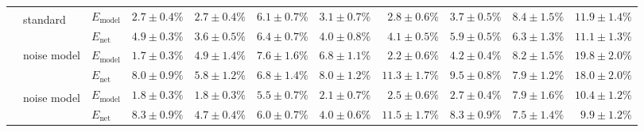\begin{sidewaystable}
\begin{tabular}{p{2.2cm} p{1.7cm} l r r r r r r r r }
	\\\cmidrule(l){2-11}
	&
	\multirow{2}{1.7cm}{\raggedleft %
	standard\textsuperscript{\dag}} &
	$E_\mathrm{model}$ & 
	\color{Gray}$2.7 \pm 0.4\%$ & \color{Gray}$2.7 \pm 0.4\%$ & \color{Gray}$6.1 \pm 0.7\%$ & \color{Gray}$3.1 \pm 0.7\%$ & \color{Gray}$2.8 \pm 0.6\%$ & \color{Gray}$3.7 \pm 0.5\%$ & \color{Gray}$8.4 \pm 1.5\%$ & \color{Gray}$11.9 \pm 1.4\%$
	\\
	& & 
	$E_\mathrm{net}$ &
	\cellcolor{White!100!SteelBlue}$\mathbf{4.9 \pm 0.3\%}$ & \cellcolor{White!100!SteelBlue}$\mathbf{3.6 \pm 0.5\%}$ & \cellcolor{White!94!SteelBlue}$6.4 \pm 0.7\%$ & \cellcolor{White!100!SteelBlue}$\mathbf{4.0 \pm 0.8\%}$ & \cellcolor{White!100!SteelBlue}$\mathbf{4.1 \pm 0.5\%}$ & \cellcolor{White!100!SteelBlue}$\mathbf{5.9 \pm 0.5\%}$ & \cellcolor{White!100!SteelBlue}$\mathbf{6.3 \pm 1.3\%}$ & \cellcolor{White!82!SteelBlue}$11.1 \pm 1.3\%$
	\\\cmidrule(l){2-11}
	&
	\multirow{2}{1.7cm}{\raggedleft %
	noise model} &
	$E_\mathrm{model}$ & 
	\color{Gray}$1.7 \pm 0.3\%$ & \color{Gray}$4.9 \pm 1.4\%$ & \color{Gray}$7.6 \pm 1.6\%$ & \color{Gray}$6.8 \pm 1.1\%$ & \color{Gray}$2.2 \pm 0.6\%$ & \color{Gray}$4.2 \pm 0.4\%$ & \color{Gray}$8.2 \pm 1.5\%$ & \color{Gray}$19.8 \pm 2.0\%$
	\\
	& & 
	$E_\mathrm{net}$ &
	\cellcolor{White!57!SteelBlue}$8.0 \pm 0.9\%$ & \cellcolor{White!69!SteelBlue}$5.8 \pm 1.2\%$ & \cellcolor{White!82!SteelBlue}$6.8 \pm 1.4\%$ & \cellcolor{White!69!SteelBlue}$8.0 \pm 1.2\%$ & \cellcolor{White!44!SteelBlue}$11.3 \pm 1.7\%$ & \cellcolor{White!57!SteelBlue}$9.5 \pm 0.8\%$ & \cellcolor{White!69!SteelBlue}$7.9 \pm 1.2\%$ & \cellcolor{White!44!SteelBlue}$18.0 \pm 2.0\%$
	\\\cmidrule(l){2-11}
	&
	\multirow{2}{1.7cm}{\raggedleft %
	noise model\textsuperscript{\dag}} &
	$E_\mathrm{model}$ & 
	\color{Gray}$1.8 \pm 0.3\%$ & \color{Gray}$\mathbf{1.8 \pm 0.3\%}$ & \color{Gray}$\mathbf{5.5 \pm 0.7\%}$ & \color{Gray}$\mathbf{2.1 \pm 0.7\%}$ & \color{Gray}$2.5 \pm 0.6\%$ & \color{Gray}$2.7 \pm 0.4\%$ & \color{Gray}$\mathbf{7.9 \pm 1.6\%}$ & \color{Gray}$10.4 \pm 1.2\%$
	\\
	& & 
	$E_\mathrm{net}$ &
	\cellcolor{White!50!SteelBlue}$8.3 \pm 0.9\%$ & \cellcolor{White!88!SteelBlue}$4.7 \pm 0.4\%$ & \cellcolor{White!100!SteelBlue}$\mathbf{6.0 \pm 0.7\%}$ & \cellcolor{White!94!SteelBlue}$4.0 \pm 0.6\%$ & \cellcolor{White!38!SteelBlue}$11.5 \pm 1.7\%$ & \cellcolor{White!82!SteelBlue}$8.3 \pm 0.9\%$ & \cellcolor{White!88!SteelBlue}$7.5 \pm 1.4\%$ & \cellcolor{White!88!SteelBlue}$9.9 \pm 1.2\%$

\end{tabular}
\end{sidewaystable}

